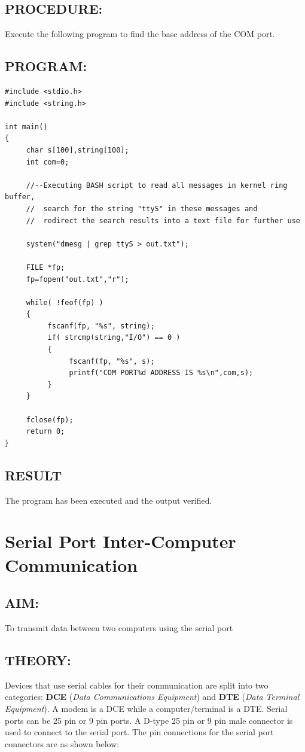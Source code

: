 \documentclass[a4paper,28pt]{report}
\begin{document}
\section*{PROCEDURE:}
Execute the following program to find the base address of the COM port.

\section*{PROGRAM:}
\begin{lstlisting}
#include <stdio.h>
#include <string.h>

int main()
{
     char s[100],string[100];
     int com=0;
     
     //--Executing BASH script to read all messages in kernel ring buffer,
     //  search for the string "ttyS" in these messages and
     //  redirect the search results into a text file for further use
     
     system("dmesg | grep ttyS > out.txt");
     
     FILE *fp;
     fp=fopen("out.txt","r");
     
     while( !feof(fp) )
     {
          fscanf(fp, "%s", string);
          if( strcmp(string,"I/O") == 0 )
          {
               fscanf(fp, "%s", s);
               printf("COM PORT%d ADDRESS IS %s\n",com,s);
          }
     }
     
     fclose(fp);
     return 0;
}
\end{lstlisting}

\section*{RESULT}
The program has been executed and the output verified.
%
%
\chapter{Serial Port Inter-Computer Communication}
%
%
%
\section*{AIM:}To transmit data between two computers using the serial port

\section*{THEORY:}
Devices that use serial cables for their communication are split into two categories: \textbf{DCE} (\emph{Data Communications Equipment}) and \textbf{DTE} (\emph{Data Terminal Equipment}). A modem is a DCE while a computer/terminal is a DTE. Serial ports can be 25 pin or 9 pin ports. A D-type 25 pin or 9 pin male connector is used to connect to the serial port. The pin connections for the serial port connectors are as shown below:
\end{document}
